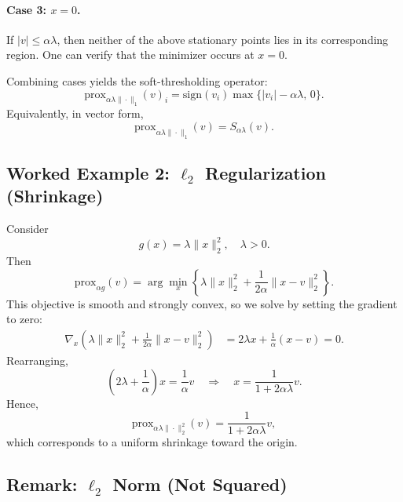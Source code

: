 \documentclass[11pt]{article}
\begin{document}
\paragraph{Case 3: $x=0$.}
If $|v|\le \alpha\lambda$, then neither of the above stationary points lies in its corresponding region. One can verify that the minimizer occurs at $x=0$.

Combining cases yields the soft-thresholding operator:
\begin{equation}
\mathrm{prox}_{\alpha \lambda\|\cdot\|_1}(v)_i
=
\mathrm{sign}(v_i)\max\{|v_i|-\alpha\lambda,\,0\}.
\end{equation}
Equivalently, in vector form,
\begin{equation}
\mathrm{prox}_{\alpha \lambda\|\cdot\|_1}(v)
=
S_{\alpha\lambda}(v).
\end{equation}

\subsection{Worked Example 2: \texorpdfstring{$\ell_2$}{l2} Regularization (Shrinkage)}

Consider
\begin{equation}
g(x) = \lambda \|x\|_2^2,
\quad \lambda>0.
\end{equation}
Then
\begin{equation}
\mathrm{prox}_{\alpha g}(v)
=
\arg\min_x
\left\{
\lambda\|x\|_2^2 + \frac{1}{2\alpha}\|x-v\|_2^2
\right\}.
\end{equation}
This objective is smooth and strongly convex, so we solve by setting the gradient to zero:
\begin{align}
\nabla_x\left(\lambda\|x\|_2^2 + \frac{1}{2\alpha}\|x-v\|_2^2\right)
&=
2\lambda x + \frac{1}{\alpha}(x-v)
= 0.
\end{align}
Rearranging,
\begin{equation}
\left(2\lambda + \frac{1}{\alpha}\right)x = \frac{1}{\alpha}v
\quad\Rightarrow\quad
x = \frac{1}{1+2\alpha\lambda}v.
\end{equation}
Hence,
\begin{equation}
\mathrm{prox}_{\alpha \lambda\|\cdot\|_2^2}(v)
=
\frac{1}{1+2\alpha\lambda}v,
\end{equation}
which corresponds to a uniform shrinkage toward the origin.

\subsection{Remark: \texorpdfstring{$\ell_2$}{l2} Norm (Not Squared)}
\end{document}
